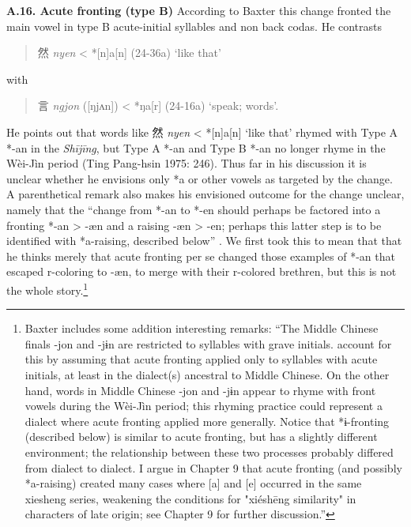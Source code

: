 \documentclass[xetex, svgnames, 12pt]{scrartcl}
\newcounter{para}
\newcommand\mypara[1]{\par\refstepcounter{para}\textbf{\thepara\space#1\space}}
\begin{document}
\mypara{A.16. Acute fronting (type B)}
According to Baxter this change fronted the main vowel in type B acute-initial syllables and non back codas. He contrasts
 \begin{quote}
 然 %
 \textit{nyen} < *[n]a[n] (24-36a) `like that'
 \end{quote} 
with 
\begin{quote}
 言 %
 \textit{ngjon} ([ŋjʌn]) < *ŋa[r] (24-16a) `speak; words'.
\end{quote}
He points out that words like  然 %
 \textit{nyen} < *[n]a[n] `like that' rhymed with Type A *-an in the
 \textit{Shījīng}, but Type A *-an and Type B *-an no longer rhyme in 
 the Wèi-Jìn period  (Ting Pang-hsin 1975: 246). Thus far in his discussion it is unclear whether he envisions only *a or other vowels as targeted by the change. A parenthetical remark also makes his envisioned outcome for the change unclear, namely that the ``change from *-an to *-en should perhaps be factored into a fronting *-an > -æn and a raising -æn > -en; perhaps this latter step is to be identified with *a-raising,
 described below'' \citep[PAGE]{Baxter1992}. 
 We first took this to mean that that he thinks merely that acute fronting per se changed those examples of *-an that escaped r-coloring to -æn, to merge with their r-colored brethren, but this is not the whole story.\footnote{Baxter includes some addition interesting remarks: ``The Middle Chinese finals -jon and -jɨn are restricted to syllables with grave initials.
 account for this by assuming that acute fronting applied only to syllables with acute
 initials, at least in the dialect(s) ancestral to Middle Chinese. On the other hand, words in
 Middle Chinese -jon and -jɨn appear to rhyme with front vowels during the Wèi-Jìn period;
 this rhyming practice could represent a dialect where acute fronting applied more
 generally. Notice that *ɨ-fronting (described below) is similar to acute fronting, but has a
 slightly different environment; the relationship between these two processes probably
 differed from dialect to dialect.
 I argue in Chapter 9 that acute fronting (and possibly *a-raising) created many cases
 where [a] and [e] occurred in the same xiesheng series, weakening the conditions for
 "xiéshēng similarity" in characters of late origin; see Chapter 9 for further discussion.''}  
\end{document}
